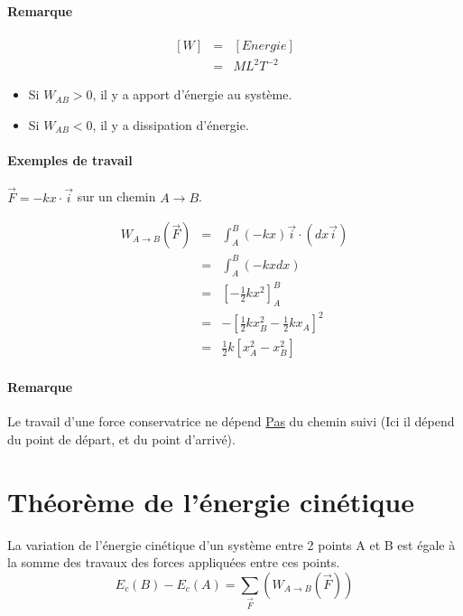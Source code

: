 \paragraph{Remarque}
\[\begin{array}{rcl}
		{[W]} &=& {[Energie]} \\
			   &=& ML^2T^{-2}\end{array}\]

\begin{itemize}
	\item Si $W_{AB} > 0$, il y a apport d'énergie au système.
	\item Si $W_{AB} < 0$, il y a dissipation d'énergie.
\end{itemize}

\paragraph{Exemples de travail}

$\vec{F} = -kx\cdot \vec{i}$ sur un chemin $A \rightarrow B$.

\[\begin{array}{rcl}
		W_{A\to B}(\vec{F}) &=& \int_A^B(-kx)\vec{i} \cdot (dx\vec{i}) \\
							 &=& \int_A^B(-kxdx) \\
							&=& [-\frac{1}{2}kx^2]^B_A \\
							&=& -[\frac{1}{2}kx^2_B - \frac{1}{2}kx_A]^2 \\
				   &=& \frac{1}{2}k[x_A^2 - x^2_B]
\end{array}\]

\paragraph{Remarque} Le travail d'une force conservatrice ne dépend \ul{Pas} du chemin suivi (Ici il dépend du point de départ, et du point d'arrivé).

\section{Théorème de l'énergie cinétique} La variation de l'énergie cinétique d'un système entre 2 points A et B est égale à la somme des travaux des forces appliquées entre ces points.
\[E_c(B) - E_c(A) = \sum_{\vec{F}} (W_{A \to B}(\vec{F}))\]
